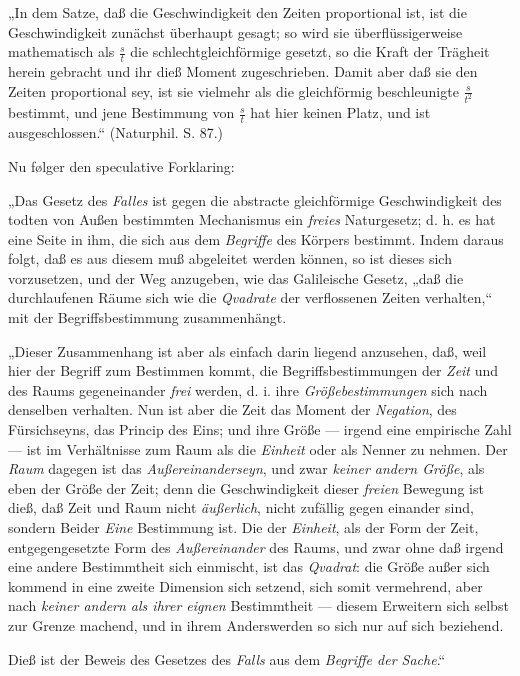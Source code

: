 \documentclass[12pt]{book}
\newcommand{\opage}[1]{\marginnote{\footnotesize\textit{[#1]}}}
\begin{document}
„In dem Satze, daß die Geschwindigkeit den Zeiten proportional ist, ist die
Geschwindigkeit zunächst überhaupt gesagt; so wird sie überflüssigerweise
mathematisch als $\frac{s}{t}$ die schlechtgleichförmige gesetzt, so die Kraft
der Trägheit herein gebracht und ihr dieß Moment zugeschrieben. Damit aber daß
sie den Zeiten proportional sey, ist sie vielmehr als die gleichförmig
beschleunigte $\frac{s}{t^2}$ bestimmt, und jene Bestimmung von $\frac{s}{t}$ hat
hier keinen Platz, und ist ausgeschlossen.“ (Naturphil. S. 87.)

Nu følger den speculative Forklaring:

„Das Gesetz des \emph{Falles} ist gegen die abstracte gleichförmige
Geschwindigkeit des todten von Außen bestimmten Mechanismus ein \emph{freies}
Naturgesetz; d. h. es hat eine Seite in ihm, die sich aus dem \emph{Begriffe}
des Körpers bestimmt. Indem daraus folgt, daß es aus diesem muß abgeleitet
werden können, so ist dieses sich vorzusetzen, und der Weg anzugeben, wie das
Galileische Gesetz, „daß die durchlaufenen Räume sich wie die \emph{Qvadrate}
der verflossenen Zeiten verhalten,“ mit der Begriffsbestimmung zusammenhängt.

„Dieser Zusammenhang ist aber als einfach darin liegend anzusehen, daß, weil
hier der Begriff zum Bestimmen kommt, die Begriffsbestimmungen der \emph{Zeit}
und des Raums gegeneinander \emph{frei} werden, d. i. ihre
\emph{Größebestimmungen} sich nach denselben verhalten. Nun ist aber die Zeit
das Moment der \emph{Negation}, des Fürsichseyns, das Princip des Eins; und ihre
Größe --- irgend eine empirische Zahl --- ist im Verhältnisse zum Raum als die
\emph{Einheit} oder als Nenner zu nehmen. Der \emph{Raum} dagegen ist das
\emph{Außereinanderseyn}, und zwar \emph{keiner andern Größe}, als eben der Größe
der Zeit; denn die Geschwindigkeit dieser \emph{freien} Bewegung ist dieß, daß
Zeit und Raum nicht \emph{äußerlich}, nicht zufällig
\opage{163} gegen einander sind, sondern Beider \emph{Eine} Bestimmung ist. Die der
\emph{Einheit}, als der Form der Zeit, entgegengesetzte Form des
\emph{Außereinander} des Raums, und zwar ohne daß irgend eine andere
Bestimmtheit sich einmischt, ist das \emph{Qvadrat}: die Größe außer sich
kommend in eine zweite Dimension sich setzend, sich somit vermehrend, aber nach
\emph{keiner andern als ihrer eignen} Bestimmtheit --- diesem Erweitern sich
selbst zur Grenze machend, und in ihrem Anderswerden so sich nur auf sich
beziehend.

Dieß ist der Beweis des Gesetzes des \emph{Falls} aus dem \emph{Begriffe der
Sache}.“
\end{document}
